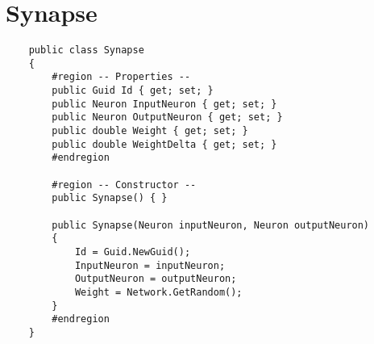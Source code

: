\documentclass[12pt,a4paper]{article}
\begin{document}
	\section*{Synapse}
	\begin{lstlisting}
	public class Synapse
	{
		#region -- Properties --
		public Guid Id { get; set; }
		public Neuron InputNeuron { get; set; }
		public Neuron OutputNeuron { get; set; }
		public double Weight { get; set; }
		public double WeightDelta { get; set; }
		#endregion

		#region -- Constructor --
		public Synapse() { }

		public Synapse(Neuron inputNeuron, Neuron outputNeuron)
		{
			Id = Guid.NewGuid();
			InputNeuron = inputNeuron;
			OutputNeuron = outputNeuron;
			Weight = Network.GetRandom();
		}
		#endregion
	}
	\end{lstlisting}
	
\end{document}
